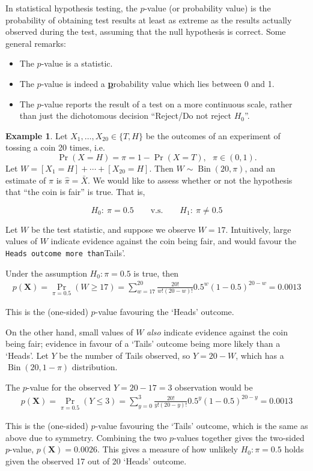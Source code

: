 \documentclass[
]{book}
\providecommand{\tightlist}{%
  \setlength{\itemsep}{0pt}\setlength{\parskip}{0pt}}
\newcommand{\bX}{{\boldsymbol X}}
\DeclareMathOperator{\Bin}{Bin}
\theoremstyle{definition}
\theoremstyle{definition}
\newtheorem{example}{Example}[chapter]
\theoremstyle{definition}
\theoremstyle{definition}
\theoremstyle{remark}
\begin{document}
In statistical hypothesis testing, the \(p\)-value (or probability value) is the probability of obtaining test results at least as extreme as the results actually observed during the test, assuming that the null hypothesis is correct. Some general remarks:

\begin{itemize}
\tightlist
\item
  The \(p\)-value is a statistic.
\item
  The \(p\)-value is indeed a \uline{\textbf{p}}robability value which lies between 0 and 1.
\item
  The \(p\)-value reports the result of a test on a more continuous scale, rather than just the dichotomous decision ``Reject/Do not reject \(H_0\)''.
\end{itemize}

\begin{example}
\protect\hypertarget{exm:binom}{}\label{exm:binom}Let \(X_1,\dots,X_{20} \in \{T,H\}\) be the outcomes of an experiment of tossing a coin 20 times, i.e.
\[\Pr(X = H) = \pi = 1 - \Pr(X=T), \ \ \ \pi \in (0,1).\]
Let \(W= [X_1=H] + \cdots + [X_{20}=H]\).
Then \(W\sim\Bin(20,\pi)\), and an estimate of \(\pi\) is \(\hat\pi=\bar X\).
We would like to assess whether or not the hypothesis that ``the coin is fair'' is true.
That is,

\[H_0: \ \pi = 0.5 \hspace{2em}\text{v.s.}\hspace{2em} H_1: \ \pi \neq 0.5\]

Let \(W\) be the test statistic, and suppose we observe \(W=17\).
Intuitively, large values of \(W\) indicate evidence against the coin being fair, and would favour the \texttt{Heads\textquotesingle{}\ outcome\ more\ than}Tails'.

Under the assumption \(H_0:\pi=0.5\) is true, then
\begin{align*}
p(\bX) = \Pr_{\pi=0.5} (W \geq 17) = \sum_{w=17}^{20} \frac{20!}{w!(20-w)!} 0.5^w(1-0.5)^{20-w} = 0.0013
\end{align*}

This is the (one-sided) \(p\)-value favouring the `Heads' outcome.

On the other hand, small values of \(W\) \emph{also} indicate evidence against the coin being fair; evidence in favour of a `Tails' outcome being more likely than a `Heads'.
Let \(Y\) be the number of Tails observed, so \(Y=20-W\), which has a \(\Bin(20,1-\pi)\) distribution.

The \(p\)-value for the observed \(Y=20-17=3\) observation would be
\begin{align*}
p(\bX) = \Pr_{\pi=0.5} (Y \leq 3) = \sum_{y=0}^{3} \frac{20!}{y!(20-y)!} 0.5^y(1-0.5)^{20-y} = 0.0013
\end{align*}

This is the (one-sided) \(p\)-value favouring the `Tails' outcome, which is the same as above due to symmetry.
Combining the two \(p\)-values together gives the two-sided \(p\)-value, \(p(\bX)=0.0026\).
This gives a measure of how unlikely \(H_0:\pi=0.5\) holds given the observed 17 out of 20 `Heads' outcome.
\end{example}
\end{document}
